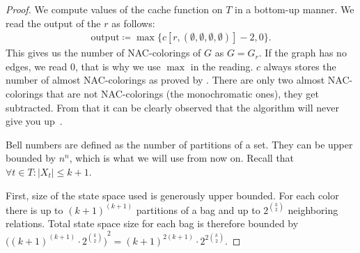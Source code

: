 \begin{proof}
	We compute values of the cache function on \( T \) in a bottom-up manner.
	We read the output of the \RootNode{} \( r \) as follows:
	\begin{align*}
		\text{output} \coloneqq \max\{c[r, (\emptyset,\emptyset,\emptyset,\emptyset)] - 2, 0\}.
	\end{align*}
	This gives us the number of NAC-colorings of \( G \) as \( G = G_r \).
	If the graph has no edges, we read \( 0 \), that is why we use \( \max{} \) in the reading.
	\( c \) always stores the number of almost NAC-colorings as proved by
	.
	There are only two almost NAC-colorings
	that are not NAC-colorings (the monochromatic ones), they get subtracted.
	From that it can be clearly observed that the algorithm
	will never give you up~\cite{never_gonna_give_you_up}.

	Bell numbers are defined as the number of partitions of a set.
	They can be upper bounded by \( n^n \), which is what we will use from now on.
	Recall that \( \forall t \in T : |X_t| \le k+1 \).

	First, size of the state space used is generously upper bounded.
	For each color there is up to \( {(k+1)}^{(k+1)} \) partitions of a bag and
	up to \( 2^{\binom{k}{2}} \) neighboring relations.
	Total state space size for each bag is therefore bounded by
	\( {\big({(k+1)}^{(k+1)} \cdot 2^{\binom{k}{2}} \big)}^2 = {(k+1)}^{2(k+1)} \cdot 2^{2 \binom{k}{2}} \).


\end{proof}
